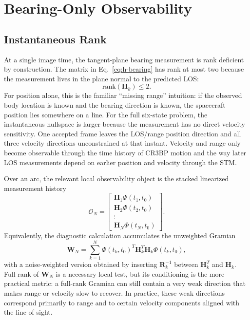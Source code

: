 \documentclass[10pt,twocolumn]{article}
\newcommand{\mat}[1]{\mathbf{#1}}
\begin{document}
\section{Bearing-Only Observability}
\label{sec:observability}
\subsection{Instantaneous Rank}
At a single image time, the tangent-plane bearing measurement is rank deficient by construction.  The matrix in Eq.~\eqref{eq:h-bearing} has rank at most two because the measurement lives in the plane normal to the predicted LOS:
\begin{equation}
\mathrm{rank}(\mat{H}_k)\le 2.
\end{equation}
For position alone, this is the familiar ``missing range'' intuition: if the observed body location is known and the bearing direction is known, the spacecraft position lies somewhere on a line.  For the full six-state problem, the instantaneous nullspace is larger because the measurement has no direct velocity sensitivity.  One accepted frame leaves the LOS/range position direction and all three velocity directions unconstrained at that instant.  Velocity and range only become observable through the time history of CR3BP motion and the way later LOS measurements depend on earlier position and velocity through the STM.

Over an arc, the relevant local observability object is the stacked linearized measurement history
\begin{equation}
\mathcal{O}_N =
\begin{bmatrix}
\mat{H}_1\Phi(t_1,t_0)\\
\mat{H}_2\Phi(t_2,t_0)\\
\vdots\\
\mat{H}_N\Phi(t_N,t_0)
\end{bmatrix}.
\end{equation}
Equivalently, the diagnostic calculation accumulates the unweighted Gramian
\begin{equation}
\mat{W}_N=\sum_{k=1}^{N}
\Phi(t_k,t_0)^T\mat{H}_k^T\mat{H}_k\Phi(t_k,t_0),
\label{eq:gramian}
\end{equation}
with a noise-weighted version obtained by inserting $\mat{R}_k^{-1}$ between $\mat{H}_k^T$ and $\mat{H}_k$.  Full rank of $\mat{W}_N$ is a necessary local test, but its conditioning is the more practical metric: a full-rank Gramian can still contain a very weak direction that makes range or velocity slow to recover.  In practice, these weak directions correspond primarily to range and to certain velocity components aligned with the line of sight.
\end{document}
